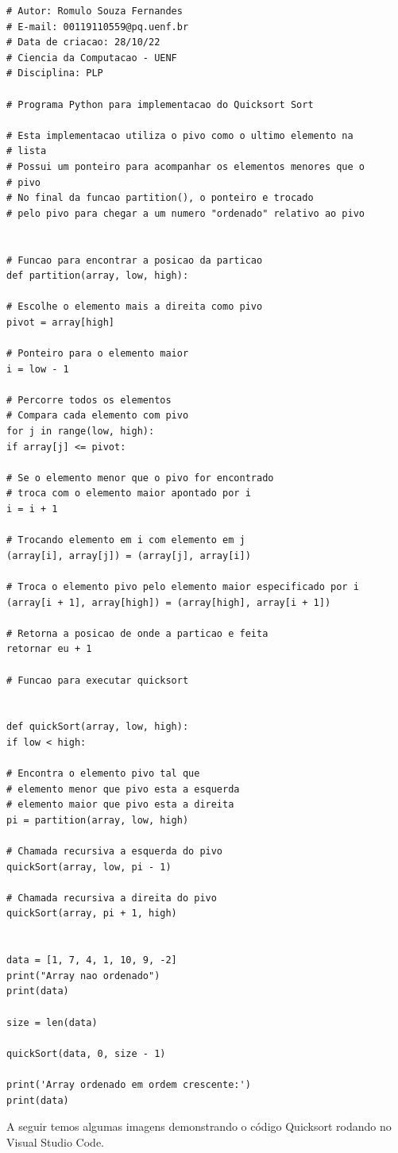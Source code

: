 \begin{lstlisting}
# Autor: Romulo Souza Fernandes
# E-mail: 00119110559@pq.uenf.br
# Data de criacao: 28/10/22
# Ciencia da Computacao - UENF
# Disciplina: PLP

# Programa Python para implementacao do Quicksort Sort

# Esta implementacao utiliza o pivo como o ultimo elemento na 
# lista
# Possui um ponteiro para acompanhar os elementos menores que o 
# pivo
# No final da funcao partition(), o ponteiro e trocado 
# pelo pivo para chegar a um numero "ordenado" relativo ao pivo


# Funcao para encontrar a posicao da particao
def partition(array, low, high):

# Escolhe o elemento mais a direita como pivo
pivot = array[high]

# Ponteiro para o elemento maior
i = low - 1

# Percorre todos os elementos
# Compara cada elemento com pivo
for j in range(low, high):
if array[j] <= pivot:

# Se o elemento menor que o pivo for encontrado
# troca com o elemento maior apontado por i
i = i + 1

# Trocando elemento em i com elemento em j
(array[i], array[j]) = (array[j], array[i])

# Troca o elemento pivo pelo elemento maior especificado por i
(array[i + 1], array[high]) = (array[high], array[i + 1])

# Retorna a posicao de onde a particao e feita
retornar eu + 1

# Funcao para executar quicksort


def quickSort(array, low, high):
if low < high:

# Encontra o elemento pivo tal que
# elemento menor que pivo esta a esquerda
# elemento maior que pivo esta a direita
pi = partition(array, low, high)

# Chamada recursiva a esquerda do pivo
quickSort(array, low, pi - 1)

# Chamada recursiva a direita do pivo
quickSort(array, pi + 1, high)


data = [1, 7, 4, 1, 10, 9, -2]
print("Array nao ordenado")
print(data)

size = len(data)

quickSort(data, 0, size - 1)

print('Array ordenado em ordem crescente:')
print(data)
\end{lstlisting}
	A seguir temos algumas imagens demonstrando o código Quicksort rodando no Visual Studio Code.
	
